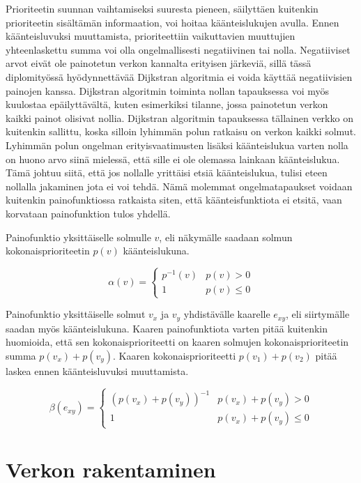   Prioriteetin suunnan vaihtamiseksi suuresta pieneen, säilyttäen kuitenkin prioriteetin sisältämän informaation, voi hoitaa käänteislukujen avulla.
  Ennen käänteisluvuksi muuttamista, prioriteettiin vaikuttavien muuttujien yhteenlaskettu summa voi olla ongelmallisesti negatiivinen tai nolla.
  Negatiiviset arvot eivät ole painotetun verkon kannalta erityisen järkeviä, sillä tässä diplomityössä hyödynnettävää Dijkstran algoritmia ei voida käyttää negatiivisien painojen kanssa.
  Dijkstran algoritmin toiminta nollan tapauksessa voi myös kuulostaa epäilyttävältä, kuten esimerkiksi tilanne, jossa painotetun verkon kaikki painot olisivat nollia.
  Dijkstran algoritmin tapauksessa tällainen verkko on kuitenkin sallittu, koska silloin lyhimmän polun ratkaisu on verkon kaikki solmut.
  Lyhimmän polun ongelman erityisvaatimusten lisäksi käänteislukua varten nolla on huono arvo siinä mielessä, että sille ei ole olemassa lainkaan käänteislukua.
  Tämä johtuu siitä, että jos nollalle yrittäisi etsiä käänteislukua, tulisi eteen nollalla jakaminen jota ei voi tehdä.
  Nämä molemmat ongelmatapaukset voidaan kuitenkin painofunktiossa ratkaista siten, että käänteisfunktiota ei etsitä, vaan korvataan painofunktion tulos yhdellä.

  Painofunktio yksittäiselle solmulle \(v\), eli näkymälle saadaan solmun kokonaisprioriteetin \(p(v)\) käänteislukuna.

  \[\alpha(v) = \begin{cases}
    p^{-1}(v) & p(v) > 0 \\
    1 & p(v) \leq 0
  \end{cases}\]

  Painofunktio yksittäiselle solmut \(v_x\) ja \(v_y\) yhdistävälle kaarelle \(e_{xy}\), eli siirtymälle saadan myös käänteislukuna.
  Kaaren painofunktiota varten pitää kuitenkin huomioida, että sen kokonaisprioriteetti on kaaren solmujen kokonaisprioriteetin summa \(p(v_x) + p(v_y)\).
  Kaaren kokonaisprioriteetti \(p(v_1) + p(v_2)\) pitää laskea ennen käänteisluvuksi muuttamista.

  \[\beta(e_{xy}) = \begin{cases}
    (p(v_x) + p(v_y))^{-1} & p(v_x) + p(v_y) > 0 \\
    1 & p(v_x) + p(v_y) \leq 0
  \end{cases}\]

\section{Verkon rakentaminen} \label{ch:10_verkon_rakentaminen}

